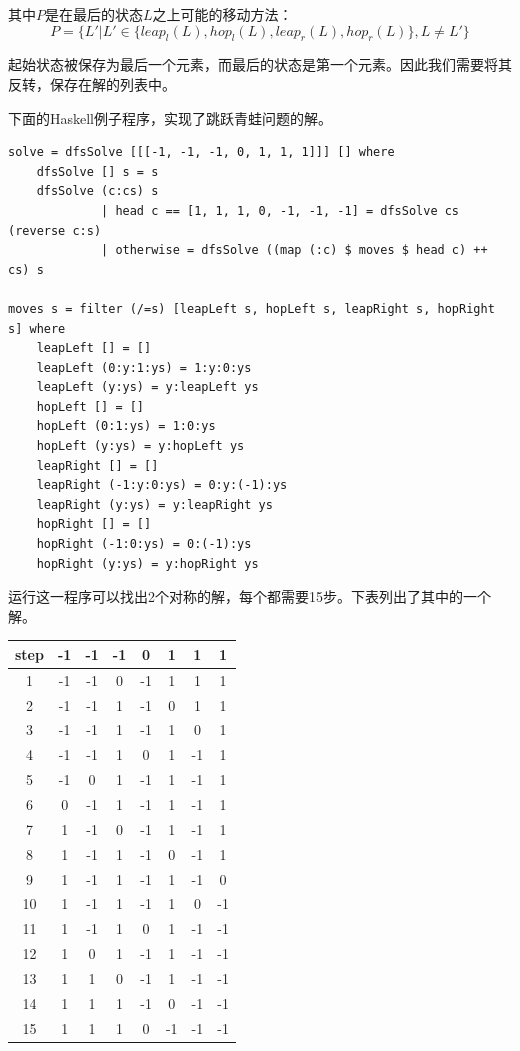 \documentclass[UTF8]{article}
\begin{document}
其中$P$是在最后的状态$L$之上可能的移动方法：
\[
P = \{ L'  | L' \in \{leap_l(L), hop_l(L), leap_r(L), hop_r(L)\}, L \neq L'\}
\]

起始状态被保存为最后一个元素，而最后的状态是第一个元素。因此我们需要将其反转，保存在解的列表中。

下面的Haskell例子程序，实现了跳跃青蛙问题的解。

\lstset{language=Haskell}
\begin{lstlisting}
solve = dfsSolve [[[-1, -1, -1, 0, 1, 1, 1]]] [] where
    dfsSolve [] s = s
    dfsSolve (c:cs) s
             | head c == [1, 1, 1, 0, -1, -1, -1] = dfsSolve cs (reverse c:s)
             | otherwise = dfsSolve ((map (:c) $ moves $ head c) ++ cs) s

moves s = filter (/=s) [leapLeft s, hopLeft s, leapRight s, hopRight s] where
    leapLeft [] = []
    leapLeft (0:y:1:ys) = 1:y:0:ys
    leapLeft (y:ys) = y:leapLeft ys
    hopLeft [] = []
    hopLeft (0:1:ys) = 1:0:ys
    hopLeft (y:ys) = y:hopLeft ys
    leapRight [] = []
    leapRight (-1:y:0:ys) = 0:y:(-1):ys
    leapRight (y:ys) = y:leapRight ys
    hopRight [] = []
    hopRight (-1:0:ys) = 0:(-1):ys
    hopRight (y:ys) = y:hopRight ys
\end{lstlisting}

运行这一程序可以找出2个对称的解，每个都需要15步。下表列出了其中的一个解。

\begin{tabular}{|c||c|c|c|c|c|c|c|}
\hline
step & -1 & -1 & -1 & 0 & 1 & 1 & 1 \\
\hline
1 & -1 & -1 & 0 & -1 & 1 & 1 & 1 \\
2 & -1 & -1 & 1 & -1 & 0 & 1 & 1 \\
3 & -1 & -1 & 1 & -1 & 1 & 0 & 1 \\
4 & -1 & -1 & 1 & 0 & 1 & -1 & 1 \\
5 & -1 & 0 & 1 & -1 & 1 & -1 & 1 \\
6 & 0 & -1 & 1 & -1 & 1 & -1 & 1 \\
7 & 1 & -1 & 0 & -1 & 1 & -1 & 1 \\
8 & 1 & -1 & 1 & -1 & 0 & -1 & 1 \\
9 & 1 & -1 & 1 & -1 & 1 & -1 & 0 \\
10 & 1 & -1 & 1 & -1 & 1 & 0 & -1 \\
11 & 1 & -1 & 1 & 0 & 1 & -1 & -1 \\
12 & 1 & 0 & 1 & -1 & 1 & -1 & -1 \\
13 & 1 & 1 & 0 & -1 & 1 & -1 & -1 \\
14 & 1 & 1 & 1 & -1 & 0 & -1 & -1 \\
15 & 1 & 1 & 1 & 0 & -1 & -1 & -1 \\
\hline
\end{tabular}
\end{document}
